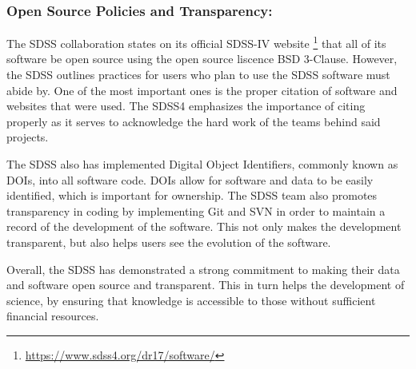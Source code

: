 \documentclass[preprint,linenumbers, longauthor]{aastex631}
\begin{document}
\subsubsection{Open Source Policies and Transparency:} 
The SDSS collaboration states on its official SDSS-IV website \footnote{\url{https://www.sdss4.org/dr17/software/}} that all of its software be open source using the open source liscence BSD 3-Clause.
However, the SDSS outlines practices for users who plan to use the SDSS software must abide by. One of the most important ones is the proper citation of software and websites that were used. 
The SDSS4 emphasizes the importance of citing properly as it serves to acknowledge the hard work of the teams behind said projects.

The SDSS also has implemented Digital Object Identifiers, commonly known as DOIs, into all software code. DOIs allow for software and data to be easily identified, which is important for ownership.
The SDSS team also promotes transparency in coding by implementing Git and SVN in order to maintain a record of the development of the software. This not only makes the development transparent, but also helps users see the evolution of the software.

Overall, the SDSS has demonstrated a strong commitment to making their data and software open source and transparent. This in turn helps the development of science, by ensuring that knowledge is accessible to those without sufficient financial resources. 

\end{document}
